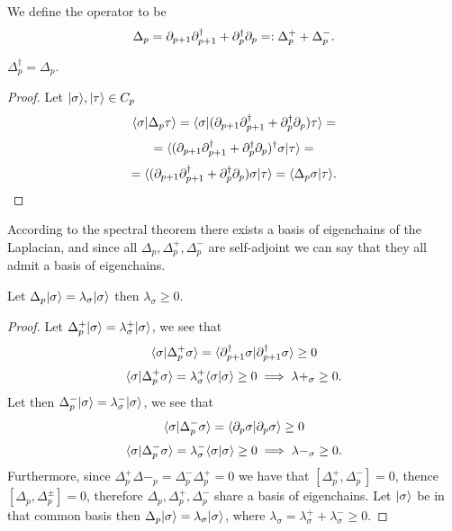 \documentclass[../1.tex]{subfiles}
\begin{document}
    
    \begin{defn}
        We define the  operator to be 
        \[ \Delta_p = \partial_{p+1}\partial^\dagger_{p+1} + \partial^\dagger_p\partial_p =: \Delta^+_p + \Delta^-_p.\]
    \end{defn}

    \begin{prop}
        $\Delta^\dagger_p = \Delta_p.$
    \end{prop}
    \begin{proof}
        Let $| \sigma \rangle, | \tau \rangle \in C_p$ 
        \[ \langle \sigma | \Delta_p\tau \rangle=\langle \sigma | (\partial_{p+1}\partial^\dagger_{p+1} + \partial^\dagger_p\partial_p)\tau \rangle = \]
        \[ = \langle (\partial_{p+1}\partial^\dagger_{p+1} + \partial^\dagger_p\partial_p)^\dagger\sigma | \tau \rangle = \]
        \[ = \langle (\partial_{p+1}\partial^\dagger_{p+1} + \partial^\dagger_p\partial_p)\sigma | \tau \rangle = \langle \Delta_p\sigma | \tau \rangle. \]
    \end{proof}
    According to the spectral theorem there exists a basis of eigenchains of the Laplacian, and since all $\Delta_p, \Delta^+_p, \Delta^-_p$
    are self-adjoint we can say that they all admit a basis of eigenchains.

    \begin{prop}
        Let $\Delta_p| \sigma \rangle = \lambda_\sigma| \sigma \rangle$ then $\lambda_\sigma \geq 0$.
    \end{prop}
    \begin{proof}
        Let $\Delta^+_p| \sigma \rangle = \lambda^+_\sigma | \sigma \rangle$, we see that
        \[ \langle \sigma | \Delta^+_p\sigma \rangle = \langle \partial^\dagger_{p+1}\sigma | \partial^\dagger_{p+1}\sigma \rangle \geq 0 \]
        \[ \langle \sigma | \Delta^+_p\sigma \rangle = \lambda^+_\sigma\langle \sigma | \sigma \rangle \geq 0 \implies \lambda+_\sigma \geq 0.\]
        Let then $\Delta^-_p| \sigma \rangle = \lambda^-_\sigma | \sigma \rangle$, we see that
        \[ \langle \sigma | \Delta^-_p\sigma \rangle = \langle \partial_p\sigma | \partial_p\sigma \rangle \geq 0 \]
        \[ \langle \sigma | \Delta^-_p\sigma \rangle = \lambda^-_\sigma\langle \sigma | \sigma \rangle \geq 0 \implies \lambda-_\sigma \geq 0.\]
        Furthermore, since $\Delta^+_p\Delta-_p = \Delta^-_p\Delta^+_p = 0$ we have that $[\Delta^+_p,\Delta^-_p] = 0$, thence
        $[\Delta_p, \Delta^\pm_p] = 0$, therefore $\Delta_p, \Delta^+_p, \Delta^-_p$ share a basis of eigenchains.
        Let $| \sigma \rangle$ be in that common basis then $\Delta_p| \sigma \rangle = \lambda_\sigma| \sigma \rangle$, where
        $\lambda_\sigma = \lambda^+_\sigma + \lambda^-_\sigma \geq 0$.
    \end{proof}
\end{document}
